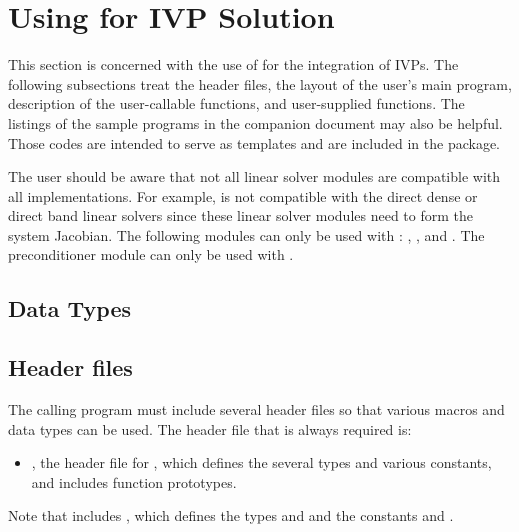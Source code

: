 \chapter{Using {\cvode} for IVP Solution}\label{s:simulation}

This section is concerned with the use of {\cvode} for the integration of IVPs.
The following subsections treat the header files, the layout of the user's main
program, description of the {\cvode} user-callable functions, and user-supplied functions. 
The listings of the sample programs in the companion document \cite{} may also be helpful. 
Those codes are intended to serve as templates and are included in the {\cvode} package.

The user should be aware that not all linear solver modules are compatible 
with all {\nvector} implementations. 
For example, {\nvecp} is not compatible with the direct dense or direct band 
linear solvers since these linear solver modules need to form the system Jacobian.
The following {\cvode} modules can only be used with {\nvecs}:
{\cvdense}, {\cvband}, and {\cvbandpre}. The preconditioner module {\cvbbdpre}
can only be used with {\nvecp}. 

\section{Data Types}\label{s:types}


\section{Header files}\label{ss:header_sim}

The calling program must include several header files so that various macros
and data types can be used. The header file that is always required is:
\begin{itemize}
\item  {}, 
  the header file for {\cvode}, which defines the several
  types and various constants, and includes function prototypes.
\end{itemize}
Note that  includes , 
which defines the types  and 
and the constants  and .

